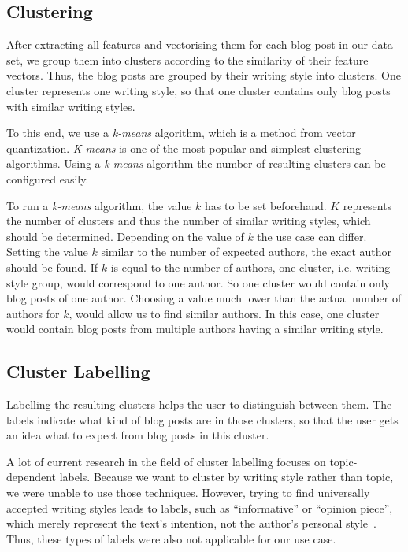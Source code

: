 
\subsection{Clustering}
\label{sec:clustering}

After extracting all features and vectorising them for each blog post in our data set, we group them into clusters according to the similarity of their feature vectors.
Thus, the blog posts are grouped by their writing style into clusters.
One cluster represents one writing style, so that one cluster contains only blog posts with similar writing styles.


To this end, we use a \textit{k-means} algorithm, which is a method from vector quantization.
\textit{K-means} is one of the most popular and simplest clustering algorithms.
Using a \textit{k-means} algorithm the number of resulting clusters can be configured easily.


To run a \textit{k-means} algorithm, the value $k$ has to be set beforehand.
$K$ represents the number of clusters and thus the number of similar writing styles, which should be determined.
Depending on the value of $k$ the use case can differ.
Setting the value $k$ similar to the number of expected authors, the exact author should be found.
If $k$ is equal to the number of authors, one cluster, i.e. writing style group, would correspond to one author.
So one cluster would contain only blog posts of one author.
Choosing a value much lower than the actual number of authors for $k$, would allow us to find similar authors.
In this case, one cluster would contain blog posts from multiple authors having a similar writing style.



\subsection{Cluster Labelling}
\label{sec:cluster_labeling}

Labelling the resulting clusters helps the user to distinguish between them.
The labels indicate what kind of blog posts are in those clusters, so that the user gets an idea what to expect from blog posts in this cluster.


A lot of current research in the field of cluster labelling focuses on topic-dependent labels.
Because we want to cluster by writing style rather than topic, we were unable to use those techniques.
However, trying to find universally accepted writing styles leads to labels, such as ``informative'' or ``opinion piece'', which merely represent the text's intention, not the author's personal style~\cite{lee2001genres}.
Thus, these types of labels were also not applicable for our use case.


